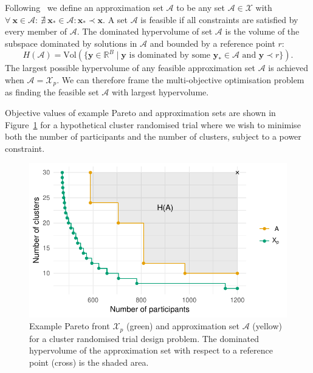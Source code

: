 \documentclass{article} %
\begin{document}
Following~\cite{Emmerich2011} we define an approximation set $\mathcal{A}$ to be any set $\mathcal{A} \in \mathcal{X}$ with $\forall~\mathbf{x} \in \mathcal{A}:~\nexists~\mathbf{x}_{*} \in \mathcal{A} : \mathbf{x}_{*} \prec \mathbf{x}$. A set $\mathcal{A}$ is feasible if all constraints are satisfied by every member of $\mathcal{A}$. The dominated hypervolume of set $\mathcal{A}$ is the volume of the subspace dominated by solutions in $\mathcal{A}$ and bounded by a reference point $r$:
\begin{equation}
H(\mathcal{A}) = \text{Vol}(\{\mathbf{y} \in \mathbb{R}^{B} \mid \mathbf{y} \text{ is dominated by some } \mathbf{y}_{*} \in \mathcal{A} \text{ and } \mathbf{y} \prec r \}). 
\end{equation}
The largest possible hypervolume of any feasible approximation set $\mathcal{A}$ is achieved when $\mathcal{A} = \mathcal{X}_{p}$. We can therefore frame the multi-objective optimisation problem as finding the feasible set $\mathcal{A}$ with largest hypervolume.

Objective values of example Pareto and approximation sets are shown in Figure~\ref{fig:fake_pareto} for a hypothetical cluster randomised trial where we wish to minimise both the number of participants and the number of clusters, subject to a power constraint.

\begin{figure}
\centering
\includegraphics[scale=0.8]{./Figures/fake_pareto}
\caption{Example Pareto front $\mathcal{X}_{p}$ (green) and approximation set $\mathcal{A}$ (yellow) for a cluster randomised trial design problem. The dominated hypervolume of the approximation set with respect to a reference point (cross) is the shaded area.}
\label{fig:fake_pareto}
\end{figure}
\end{document}
